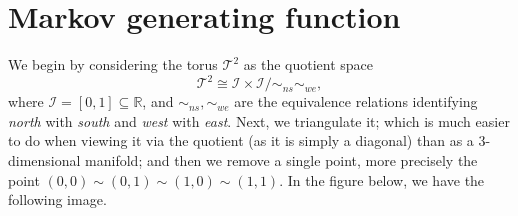 \section{Markov generating function}
We begin by considering the torus $\mathcal{T}^2$ as the quotient space
\begin{equation*}
    \mathcal{T}^2 \cong \mathcal{I}\times \mathcal{I}/\sim_{ns} \sim_{we},
\end{equation*}
where $\mathcal{I} = [0,1] \subseteq \mathbb{R}$, and $\sim_{ns}, \sim_{we}$ are the equivalence relations identifying \emph{north} with \emph{south} and \emph{west} with \emph{east}. Next, we triangulate it; which is much easier to do when viewing it via the quotient (as it is simply a diagonal) than as a 3-dimensional manifold; and then we remove a single point, more precisely the point $(0,0) \sim (0,1)\sim (1,0) \sim (1,1)$. In the figure below, we have the following image.
